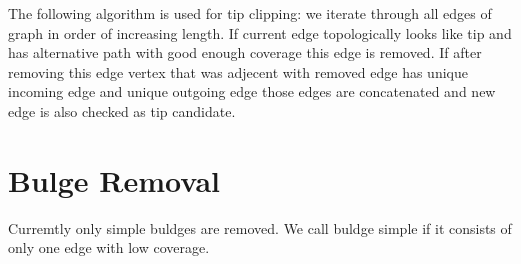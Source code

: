 \documentclass[14pt]{article}
\begin{document}
The following algorithm is used for tip clipping: we iterate through all edges of graph in order of increasing length. If current edge topologically looks like tip and has alternative path with good enough coverage this edge is removed. If after removing this edge vertex that was adjecent with removed edge has unique incoming edge and unique outgoing edge those edges are concatenated and new edge is also checked as tip candidate.

\section{Bulge Removal}

Curremtly only simple buldges are removed. We call buldge simple if it consists of only one edge with low coverage. 
\end{document}

